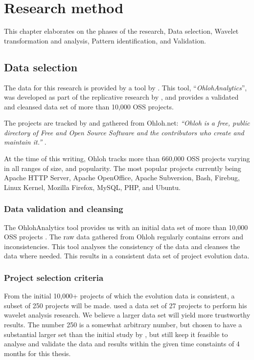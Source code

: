 \chapter{Research method}
\label{method}

This chapter elaborates on the phases of the research, Data selection, Wavelet
transformation and analysis, Pattern identification, and Validation.

\section{Data selection}
\label{method:data}

The data for this research is provided by a tool by \citet{ohlohanalytics}.
This tool, ``\emph{OhlohAnalytics}\rm'', was developed as part of the
replicative research by \citet{bruntink2014}, and provides a validated and
cleansed data set of more than 10,000 OSS projects.

The projects are tracked by and gathered from Ohloh.net: \emph{``Ohloh is a
free, public directory of Free and Open Source Software and the contributors
who create and maintain it.'' }\rm \cite{ohloh}.

At the time of this writing, Ohloh tracks more than 660,000 OSS projects varying
in all ranges of size, and popularity. The most popular projects currently being
Apache HTTP Server, Apache OpenOffice, Apache Subversion, Bash, Firebug, Linux
Kernel, Mozilla Firefox, MySQL, PHP, and Ubuntu.

\subsection{Data validation and cleansing}
The OhlohAnalytics tool provides us with an initial data set of more than
10,000 OSS projects \cite{bruntink2014}. The raw data gathered from Ohloh
regularly contains errors and inconsistencies. This tool analyses the
consistency of the data and cleanses the data where needed. This results in a
consistent data set of project evolution data.



\subsection{Project selection criteria}

From the initial 10,000+ projects of which the evolution data is consistent, a
subset of 250 projects will be made. \citet{karus2013} used a data set of 27
projects to perform his wavelet analysis research. We believe a larger
data set will yield more trustworthy results. The number 250 is a somewhat
arbitrary number, but chosen to have a substantial larger set than the initial
study by \citeauthor{karus2013}, but still keep it feasible to analyse and
validate the data and results within the given time constaints of 4 months for
this thesis.

